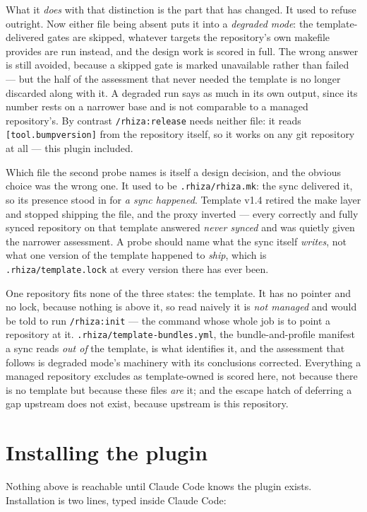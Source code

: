 \documentclass[11pt,a4paper]{article}
\newcommand{\cmd}[1]{\texttt{/rhiza:#1}}
\newcommand{\file}[1]{\texttt{#1}}
\begin{document}
What it \emph{does} with that distinction is the part that has changed. It used to
refuse outright. Now either file being absent puts it into a \emph{degraded mode}: the
template-delivered gates are skipped, whatever targets the repository's own makefile
provides are run instead, and the design work is scored in full. The wrong answer is
still avoided, because a skipped gate is marked unavailable rather than failed --- but
the half of the assessment that never needed the template is no longer discarded along
with it. A degraded run says as much in its own output, since its number rests on a
narrower base and is not comparable to a managed repository's. By contrast
\cmd{release} needs neither file: it reads \texttt{[tool.bumpversion]} from the
repository itself, so it works on any git repository at all --- this plugin included.

Which file the second probe names is itself a design decision, and the obvious choice
was the wrong one. It used to be \file{.rhiza/rhiza.mk}: the sync delivered it, so its
presence stood in for \emph{a sync happened}. Template v1.4 retired the make layer and
stopped shipping the file, and the proxy inverted --- every correctly and fully synced
repository on that template answered \emph{never synced} and was quietly given the
narrower assessment. A probe should name what the sync itself \emph{writes}, not what
one version of the template happened to \emph{ship}, which is \file{.rhiza/template.lock}
at every version there has ever been.

One repository fits none of the three states: the template. It has no pointer and no
lock, because nothing is above it, so read naively it is \emph{not managed} and would
be told to run \cmd{init} --- the command whose whole job is to point a repository at
it. \file{.rhiza/template-bundles.yml}, the bundle-and-profile manifest a sync reads
\emph{out of} the template, is what identifies it, and the assessment that follows is
degraded mode's machinery with its conclusions corrected. Everything a managed
repository excludes as template-owned is scored here, not because there is no template
but because these files \emph{are} it; and the escape hatch of deferring a gap upstream
does not exist, because upstream is this repository.

\section{Installing the plugin}

Nothing above is reachable until Claude Code knows the plugin exists. Installation is
two lines, typed inside Claude Code:
\end{document}

